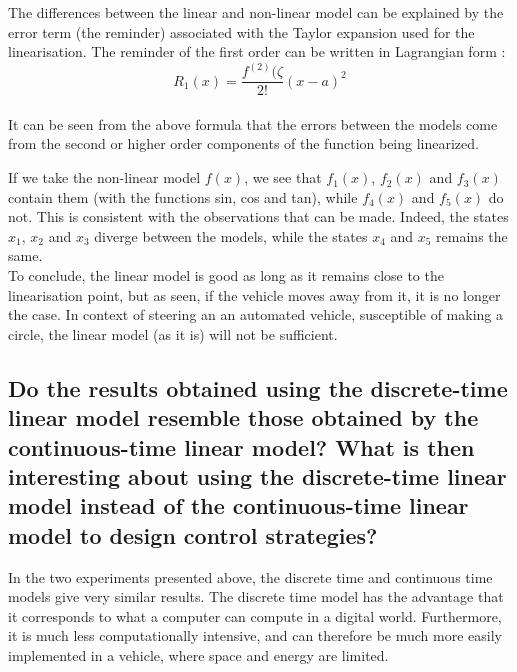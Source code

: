 The differences between the linear and non-linear model can be explained by the error term (the reminder) associated with the Taylor expansion used for the linearisation. The reminder of the first order can be written in Lagrangian form \cite{Taylor}:
\begin{equation}
    R_1(x) = \frac{f^{(2)}(\zeta}{2!}(x-a)^2
\end{equation}
\\
It can be seen from the above formula that the errors between the models come from the second or higher order components of the function being linearized.

If we take the non-linear model $f(x)$, we see that $f_1(x)$, $f_2(x)$ and $f_3(x)$ contain them (with the functions sin, cos and tan), while $f_4(x)$ and $f_5(x)$ do not. This is consistent with the observations that can be made. Indeed, the states $x_1$, $x_2$ and $x_3$ diverge between the models, while the states $x_4$ and $x_5$ remains the same.\\

To conclude, the linear model is good as long as it remains close to the linearisation point, but as seen, if the vehicle moves away from it, it is no longer the case. In context of steering an an automated vehicle, susceptible of making a circle, the linear model (as it is) will not be sufficient.


\subsection{Do the results obtained using the discrete-time linear model resemble those obtained by the continuous-time linear model? What is then interesting about using the discrete-time linear model instead of the continuous-time linear model to design control strategies?}

In the two experiments presented above, the discrete time and continuous time models give very similar results. 
The discrete time model has the advantage that it corresponds to what a computer can compute in a digital world. Furthermore, it is much less computationally intensive, and can therefore be much more easily implemented in a vehicle, where space and energy are limited.



